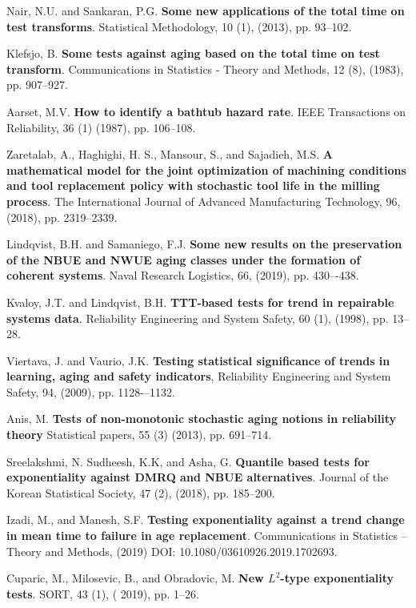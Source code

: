 \documentclass[preprint,12pt]{elsarticle}
\begin{document}
\begin{thebibliography}{}
 Nair, N.U. and Sankaran, P.G. \textbf{Some new applications of the total time on test transforms}. Statistical Methodology, 10 (1), (2013), pp. 93--102.


 Klefsjo, B. \textbf{Some tests against aging based on the total time on test transform}. Communications in Statistics - Theory and Methods, 12 (8), (1983), pp. 907--927.

 Aarset, M.V. \textbf{How to identify a bathtub hazard rate}. IEEE Transactions on Reliability, 36 (1) (1987), pp. 106--108.


 Zaretalab, A., Haghighi, H. S., Mansour, S., and Sajadieh, M.S. \textbf{A mathematical model for the joint optimization of machining conditions and tool replacement policy with stochastic tool life in the milling process}. The International Journal of Advanced Manufacturing Technology, 96, (2018), pp. 2319--2339.

 Lindqvist, B.H. and Samaniego, F.J. {\bf Some new results on the preservation of the NBUE and NWUE aging classes under the formation of coherent systems}. Naval Research Logistics, 66, (2019), pp. 430–-438.

 Kvaloy, J.T. and Lindqvist, B.H. \textbf{TTT-based tests for trend in repairable systems data}. Reliability Engineering and System Safety, 60 (1), (1998), pp. 13--28.

 Viertava, J. and  Vaurio, J.K. {\bf Testing statistical significance of trends in learning, aging and safety indicators}, Reliability Engineering and System Safety,  94, (2009), pp. 1128-–1132.

 Anis, M. {\bf Tests of non-monotonic stochastic aging notions in reliability theory} Statistical papers, 55 (3) (2013), pp. 691--714.

 Sreelakshmi, N. Sudheesh, K.K, and Asha, G. {\bf Quantile based tests for exponentiality against DMRQ and NBUE alternatives}. Journal of the Korean Statistical Society, 47 (2), (2018), pp. 185--200.

 Izadi, M., and Manesh, S.F. {\bf Testing exponentiality against a trend change in mean time to failure in age replacement}. Communications in Statistics -- Theory and Methods, (2019) DOI: 10.1080/03610926.2019.1702693.


 Cuparic, M., Milosevic, B., and Obradovic, M. {\bf New $L^2$-type exponentiality tests}. SORT, 43 (1), ( 2019), pp. 1--26.




\end{thebibliography}
\end{document}
